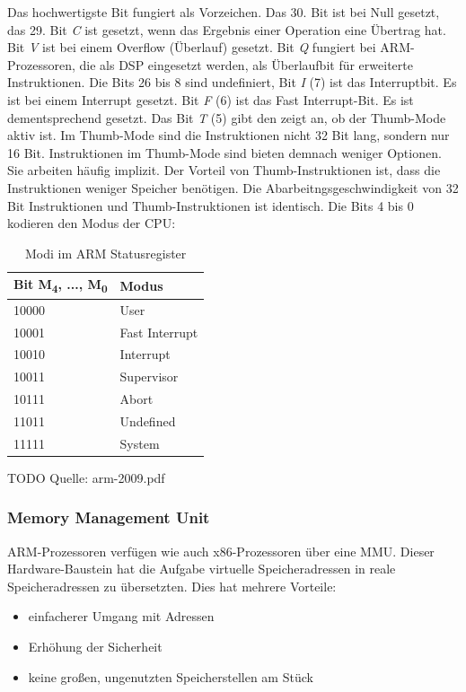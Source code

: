 Das hochwertigste Bit fungiert als Vorzeichen. Das 30. Bit ist bei Null gesetzt, das 29. Bit \textit{C} ist gesetzt, wenn das Ergebnis einer Operation eine Übertrag hat. Bit \textit{V} ist bei einem Overflow (Überlauf) gesetzt. Bit \textit{Q} fungiert bei ARM-Prozessoren, die als \ac{DSP} eingesetzt werden, als Überlaufbit für erweiterte Instruktionen. Die Bits 26 bis 8 sind undefiniert, Bit \textit{I} (7) ist das Interruptbit. Es ist bei einem Interrupt gesetzt. Bit \textit{F} (6) ist das Fast Interrupt-Bit. Es ist dementsprechend gesetzt. Das Bit \textit{T} (5) gibt den zeigt an, ob der Thumb-Mode aktiv ist. Im Thumb-Mode sind die Instruktionen nicht 32 Bit lang, sondern nur 16 Bit. Instruktionen im Thumb-Mode sind bieten demnach weniger Optionen. Sie arbeiten häufig implizit. Der Vorteil von Thumb-Instruktionen ist, dass die Instruktionen weniger Speicher benötigen. Die Abarbeitngsgeschwindigkeit von 32 Bit Instruktionen und Thumb-Instruktionen ist identisch. Die Bits 4 bis 0 kodieren den Modus der CPU:
\begin{table}
    \begin{tabular}{l|l}
    Bit M\textsubscript{4}, ..., M\textsubscript{0}  & Modus          \\ \hline
    10000 & User           \\
    10001 & Fast Interrupt \\
    10010 & Interrupt      \\
    10011 & Supervisor     \\
    10111 & Abort          \\
    11011 & Undefined      \\
    11111 & System         \\
    \end{tabular}
    \caption {Modi im ARM Statusregister}
\end{table}
TODO Quelle: arm-2009.pdf

\subsubsection{Memory Management Unit}
ARM-Prozessoren verfügen wie auch x86-Prozessoren über eine \ac{MMU}. Dieser Hardware-Baustein hat die Aufgabe virtuelle Speicheradressen in reale Speicheradressen zu übersetzten. Dies hat mehrere Vorteile: 
\begin{itemize}
\item einfacherer Umgang mit Adressen
\item Erhöhung der Sicherheit 
\item keine großen, ungenutzten Speicherstellen am Stück 
\end{itemize}

